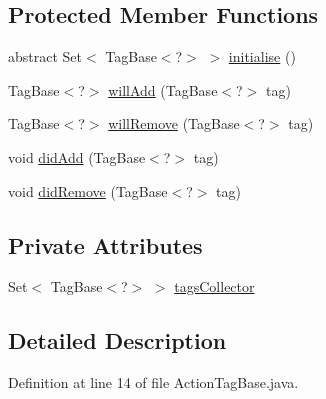 \subsection*{Protected Member Functions}
\begin{DoxyCompactItemize}
\item 
abstract Set$<$ Tag\-Base$<$?$>$ $>$ \hyperlink{classit_1_1emarolab_1_1cagg_1_1core_1_1evaluation_1_1semanticGrammar_1_1syntaxCompiler_1_1ActionTagBase_abaed3731c666d33be9d76a8c4ac36bc9}{initialise} ()
\item 
Tag\-Base$<$?$>$ \hyperlink{classit_1_1emarolab_1_1cagg_1_1core_1_1evaluation_1_1semanticGrammar_1_1syntaxCompiler_1_1ActionTagBase_a9e4f932b307352293d6339dd9a043ffa}{will\-Add} (Tag\-Base$<$?$>$ tag)
\item 
Tag\-Base$<$?$>$ \hyperlink{classit_1_1emarolab_1_1cagg_1_1core_1_1evaluation_1_1semanticGrammar_1_1syntaxCompiler_1_1ActionTagBase_a61d14d067793108a07b5c86dcaddbacb}{will\-Remove} (Tag\-Base$<$?$>$ tag)
\item 
void \hyperlink{classit_1_1emarolab_1_1cagg_1_1core_1_1evaluation_1_1semanticGrammar_1_1syntaxCompiler_1_1ActionTagBase_a95577575c3c96c4c1fe0cbf6e2faf41d}{did\-Add} (Tag\-Base$<$?$>$ tag)
\item 
void \hyperlink{classit_1_1emarolab_1_1cagg_1_1core_1_1evaluation_1_1semanticGrammar_1_1syntaxCompiler_1_1ActionTagBase_a6f469461f5625b1255ad1160b2bf2d93}{did\-Remove} (Tag\-Base$<$?$>$ tag)
\end{DoxyCompactItemize}
\subsection*{Private Attributes}
\begin{DoxyCompactItemize}
\item 
Set$<$ Tag\-Base$<$?$>$ $>$ \hyperlink{classit_1_1emarolab_1_1cagg_1_1core_1_1evaluation_1_1semanticGrammar_1_1syntaxCompiler_1_1ActionTagBase_aa316df41b4e10ded90ac30171bb62316}{tags\-Collector}
\end{DoxyCompactItemize}


\subsection{Detailed Description}


Definition at line 14 of file Action\-Tag\-Base.\-java.



